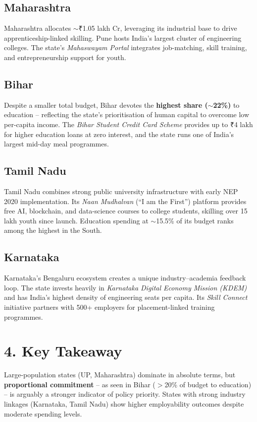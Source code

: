 \documentclass[11pt,a4paper]{article}
\newcommand{\rupee}{\textrm{\fontspec{Calibri}₹}}
\begin{document}
\subsection{Maharashtra}
Maharashtra allocates $\sim$\rupee1.05 lakh Cr, leveraging its industrial base to drive apprenticeship-linked skilling. Pune hosts India's largest cluster of engineering colleges. The state's \textit{Mahaswayam Portal} integrates job-matching, skill training, and entrepreneurship support for youth.

\subsection{Bihar}
Despite a smaller total budget, Bihar devotes the \textbf{highest share ($\sim$22\%)} to education -- reflecting the state's prioritisation of human capital to overcome low per-capita income. The \textit{Bihar Student Credit Card Scheme} provides up to \rupee4 lakh for higher education loans at zero interest, and the state runs one of India's largest mid-day meal programmes.

\subsection{Tamil Nadu}
Tamil Nadu combines strong public university infrastructure with early NEP 2020 implementation. Its \textit{Naan Mudhalvan} (``I am the First'') platform provides free AI, blockchain, and data-science courses to college students, skilling over 15 lakh youth since launch. Education spending at $\sim$15.5\% of its budget ranks among the highest in the South.

\subsection{Karnataka}
Karnataka's Bengaluru ecosystem creates a unique industry--academia feedback loop. The state invests heavily in \textit{Karnataka Digital Economy Mission (KDEM)} and has India's highest density of engineering seats per capita. Its \textit{Skill Connect} initiative partners with 500+ employers for placement-linked training programmes.

\vspace{0.15cm}
\section{4. Key Takeaway}

Large-population states (UP, Maharashtra) dominate in absolute terms, but \textbf{proportional commitment} -- as seen in Bihar ($>$20\% of budget to education) -- is arguably a stronger indicator of policy priority. States with strong industry linkages (Karnataka, Tamil Nadu) show higher employability outcomes despite moderate spending levels.
\end{document}
